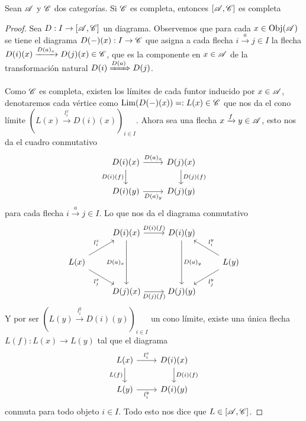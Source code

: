 \documentclass{comunicaciones}
\begin{document}
\begin{thm}
    Sean $\mathscr A$ y $\mathscr C$ dos categorías. Si $\mathscr C$ es completa, entonces $[\mathscr A,\mathscr C]$ es completa
\end{thm}
\begin{proof}
    Sea $D:I\to[\mathscr A,\mathscr C]$ un diagrama. Observemos que para cada $x\in\mathrm{Obj}(\mathscr A)$ se tiene el diagrama $D(-)(x):I\to\mathscr C$ que asigna a cada flecha 
    $i\xrightarrow{a}j\in I$ la flecha $D(i)(x)\xrightarrow{D(a)_x}D(j)(x)\in\mathscr C$, que es la componente en $x\in\mathscr A$ de la transformación natural 
    $D(i)\xRightarrow{D(a)}D(j)$.

    Como $\mathscr C$ es completa, existen los límites de cada funtor inducido por $x\in\mathscr A$, denotaremos cada vértice como $\mathrm{Lim} (D(-)(x))=:L(x)\in\mathscr C$ que nos da el cono
    límite $(L(x)\xrightarrow{l^x_i}D(i)(x))_{i\in I}$. Ahora sea una flecha $x\xrightarrow{f}y\in\mathscr A$, esto nos da el cuadro conmutativo
    \[\begin{tikzcd}
        {D(i)(x)} & {D(j)(x)} \\
        {D(i)(y)} & {D(j)(y)}
        \arrow["{D(a)_x}", from=1-1, to=1-2]
        \arrow["{D(i)(f)}"', from=1-1, to=2-1]
        \arrow["{D(j)(f)}", from=1-2, to=2-2]
        \arrow["{D(a)_y}"', from=2-1, to=2-2]
    \end{tikzcd}\]
    para cada flecha $i\xrightarrow{a}j\in I$. Lo que nos da el diagrama conmutativo
    \[\begin{tikzcd}
        & {D(i)(x)} & {D(i)(y)} \\
        {L(x)} &&& {L(y)} \\
        & {D(j)(x)} & {D(j)(y)}
        \arrow["{{D(i)(f)}}", from=1-2, to=1-3]
        \arrow["{{D(a)_x}}"', from=1-2, to=3-2]
        \arrow["{{D(a)_y}}", from=1-3, to=3-3]
        \arrow["{l^x_i}", from=2-1, to=1-2]
        \arrow["{l^x_j}"', from=2-1, to=3-2]
        \arrow["{l^y_i}"', from=2-4, to=1-3]
        \arrow["{l^y_j}", from=2-4, to=3-3]
        \arrow["{{D(j)(f)}}"', from=3-2, to=3-3]
    \end{tikzcd}\]
    Y por ser $(L(y)\xrightarrow{l^y_i}D(i)(y))_{i\in I}$ un cono límite, existe una única flecha $L(f):L(x)\to L(y)$ tal que el diagrama
    \[\begin{tikzcd}
        {L(x)} & {D(i)(x)} \\
        {L(y)} & {D(i)(y)}
        \arrow["{l^x_i}", from=1-1, to=1-2]
        \arrow["{L(f)}"', from=1-1, to=2-1]
        \arrow["{{D(i)(f)}}", from=1-2, to=2-2]
        \arrow["{l^y_i}"', from=2-1, to=2-2]
    \end{tikzcd}\]
    conmuta para todo objeto $i\in I$. Todo esto nos dice que $L\in[\mathscr A,\mathscr C]$.


\end{proof}
\end{document}

